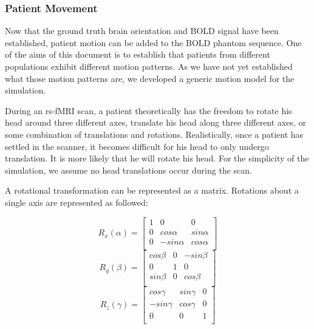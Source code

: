\clearpage

\subsubsection{Patient Movement}

Now that the ground truth brain orientation and BOLD signal have been established, patient motion can be added to the BOLD phantom sequence. One of the aims of this document is to establish that patients from different populations exhibit different motion patterns. As we have not yet established what those motion patterns are, we developed a generic motion model for the simulation.

During an rs-fMRI scan, a patient theoretically has the freedom to rotate his head around three different axes, translate his head along three different axes, or some combination of translations and rotations. Realistically, once a patient has settled in the scanner, it becomes difficult for his head to only undergo translation. It is more likely that he will rotate his head. For the simplicity of the simulation, we assume no head translations occur during the scan.

A rotational transformation can be represented as a matrix. Rotations about a single axis are represented as followed:

\begin{equation}
R_x(\alpha) = \begin{bmatrix}
 1 &  0          & 0     \\ 
 0 &  cos\alpha  & sin\alpha \\ 
 0 &  -sin\alpha & cos\alpha \\ 
\end{bmatrix}
\end{equation}
\begin{equation}
R_y(\beta) = \begin{bmatrix}
 cos\beta &  0 & -sin\beta \\ 
 0        &  1 & 0         \\ 
 sin\beta &  0 & cos\beta  \\ 
\end{bmatrix}
\end{equation}
\begin{equation}
R_z(\gamma) = \begin{bmatrix}
 cos\gamma  & sin\gamma  & 0 \\ 
 -sin\gamma & cos\gamma  & 0 \\ 
 0          & 0          & 1 \\ 
\end{bmatrix}
\end{equation}

